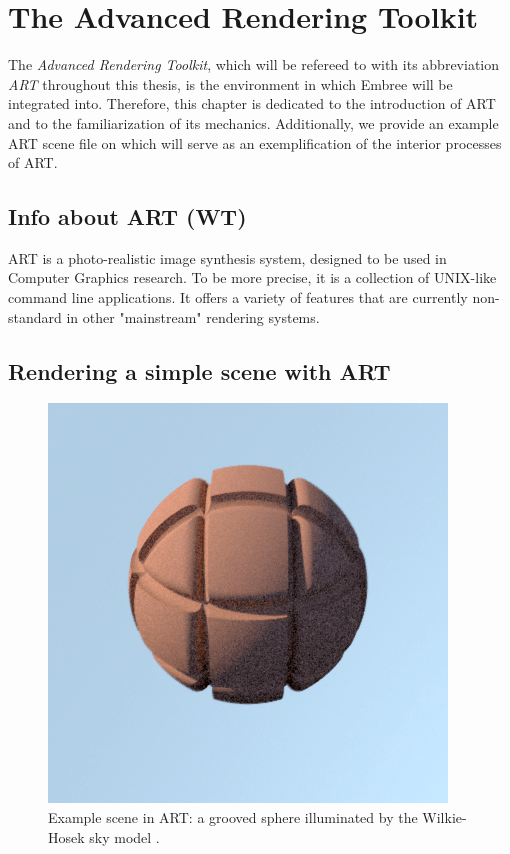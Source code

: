 \chapter{The Advanced Rendering Toolkit}
The \emph{Advanced Rendering Toolkit}, which will be refereed to with its abbreviation \emph{ART} throughout this thesis, is the environment in which Embree will be integrated into. Therefore, this chapter is dedicated to the introduction of ART and to the familiarization of its mechanics. Additionally, we provide an example ART scene file on which will serve as an exemplification of the interior processes of ART.


\section{Info about ART (WT)}

ART is a photo-realistic image synthesis system, designed to be used in Computer Graphics research. To be more precise, it is a collection of UNIX-like command line applications. It offers a variety of features that are currently non-standard in other "mainstream" rendering systems. 

\section{Rendering a simple scene with ART}



\begin{figure}
	\centering
	\includegraphics[width=.5\linewidth]{img/2 art/example_scene.png}
	\caption{Example scene in ART: a grooved sphere illuminated by the Wilkie-Hosek sky model \cite{hosek2012analytic}.}
	\label{fig:art_scene}
\end{figure}



